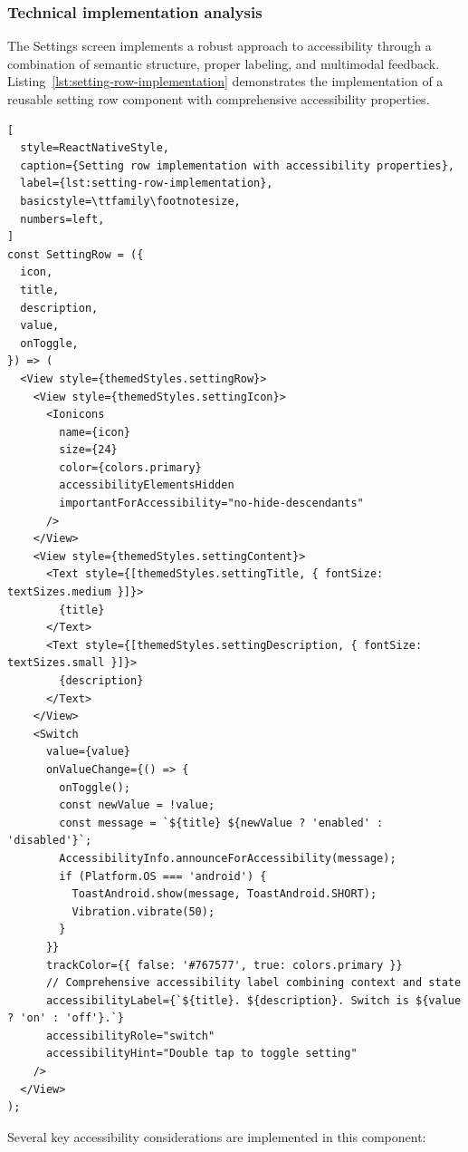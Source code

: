 \pagebreak

\subsubsection{Technical implementation analysis}

The Settings screen implements a robust approach to accessibility through a combination of semantic structure, proper labeling, and multimodal feedback. Listing~\ref{lst:setting-row-implementation} demonstrates the implementation of a reusable setting row component with comprehensive accessibility properties.

\begin{lstlisting}[
  style=ReactNativeStyle,
  caption={Setting row implementation with accessibility properties},
  label={lst:setting-row-implementation},
  basicstyle=\ttfamily\footnotesize,
  numbers=left,
]
const SettingRow = ({
  icon,
  title,
  description,
  value,
  onToggle,
}) => (
  <View style={themedStyles.settingRow}>
    <View style={themedStyles.settingIcon}>
      <Ionicons
        name={icon}
        size={24}
        color={colors.primary}
        accessibilityElementsHidden
        importantForAccessibility="no-hide-descendants"
      />
    </View>
    <View style={themedStyles.settingContent}>
      <Text style={[themedStyles.settingTitle, { fontSize: textSizes.medium }]}>
        {title}
      </Text>
      <Text style={[themedStyles.settingDescription, { fontSize: textSizes.small }]}>
        {description}
      </Text>
    </View>
    <Switch
      value={value}
      onValueChange={() => {
        onToggle();
        const newValue = !value;
        const message = `${title} ${newValue ? 'enabled' : 'disabled'}`;
        AccessibilityInfo.announceForAccessibility(message);
        if (Platform.OS === 'android') {
          ToastAndroid.show(message, ToastAndroid.SHORT);
          Vibration.vibrate(50);
        }
      }}
      trackColor={{ false: '#767577', true: colors.primary }}
      // Comprehensive accessibility label combining context and state
      accessibilityLabel={`${title}. ${description}. Switch is ${value ? 'on' : 'off'}.`}
      accessibilityRole="switch"
      accessibilityHint="Double tap to toggle setting"
    />
  </View>
);
\end{lstlisting}

Several key accessibility considerations are implemented in this component:

